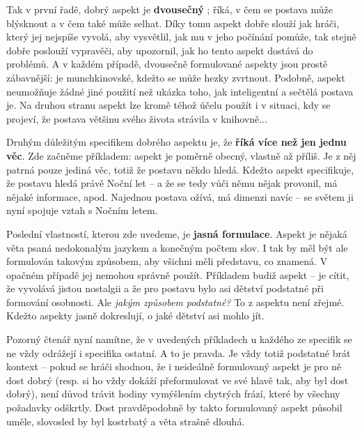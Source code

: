 \documentclass[../main.tex]{subfiles}
\begin{document}
Tak v první řadě, dobrý aspekt je \textbf{dvousečný} ; říká, v čem se postava může blýsknout a v čem také může selhat. Díky tomu aspekt dobře slouží jak hráči, který jej nejspíše vyvolá, aby vysvětlil, jak mu v jeho počínání pomůže, tak stejně dobře poslouží vypravěči, aby upozornil, jak ho tento aspekt dostává do problémů. A v každém případě, dvousečně formulované aspekty jsou prostě zábavnější:  je munchkinovské, kdežto  se může hezky zvrtnout. Podobně, aspekt  neumožňuje žádné jiné použití než ukázka toho, jak inteligentní a sečtělá postava je. Na druhou stranu aspekt  lze kromě téhož účelu použít i v situaci, kdy se projeví, že postava většinu svého života strávila v knihovně...

Druhým důležitým specifikem dobrého aspektu je, že \textbf{říká více než jen jednu věc}. Zde začněme příkladem: aspekt  je poměrně obecný, vlastně až příliš. Je z něj patrná pouze jediná věc, totiž že postavu někdo hledá. Kdežto aspekt  specifikuje, že postavu hledá právě Noční let – a že se tedy vůči němu nějak provonil, má nějaké informace, apod. Najednou postava ožívá, má dimenzi navíc – se světem ji nyní spojuje vztah s Nočním letem. 

Poslední vlastností, kterou zde uvedeme, je \textbf{jasná formulace}. Aspekt je nějaká věta psaná nedokonalým jazykem a konečným počtem slov. I tak by měl být ale formulován takovým způsobem, aby všichni měli představu, co znamená. V opačném případě jej nemohou správně použít. Příkladem budiž aspekt  – je cítit, že vyvolává jistou nostalgii a že pro postavu bylo asi dětství podstatné při formování osobnosti. Ale \emph{jakým způsobem podstatné?} To z aspektu není zřejmé. Kdežto aspekty  jasně dokreslují, o jaké dětství asi mohlo jít.

Pozorný čtenář nyní namítne, že v uvedených příkladech u každého ze specifik se ne vždy odrážejí i specifika ostatní. A to je pravda. Je vždy totiž podstatné brát kontext – pokud se hráči shodnou, že i neideálně formulovaný aspekt je pro ně dost dobrý (resp. si ho vždy dokáží přeformulovat ve své hlavě tak, aby byl dost dobrý), není důvod trávit hodiny vymýšlením chytrých frází, které by všechny požadavky odškrtly. Dost pravděpodobně by takto formulovaný aspekt působil uměle, slovosled by byl kostrbatý a věta strašně dlouhá.
\end{document}
